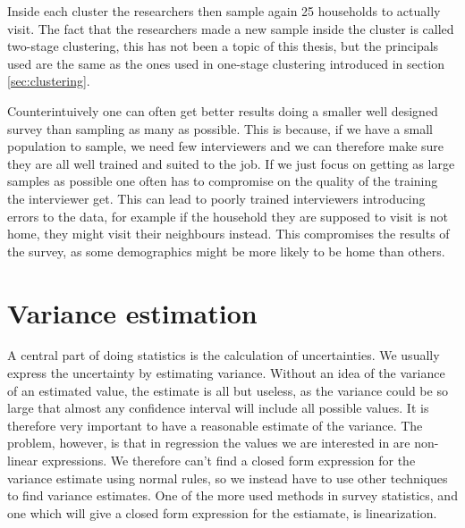 \documentclass{article}
\begin{document}
Inside each cluster the researchers then sample again 25 households to actually
visit. The fact that the researchers made a new sample inside the cluster is
called two-stage clustering, this has not been a topic of this thesis, but the
principals used are the same as the ones used in one-stage clustering introduced
in section \ref{sec:clustering}.

Counterintuively one can often get better results doing a smaller well designed
survey than sampling as many as possible. This is because, if we have a small
population to sample, we need few interviewers and we can therefore make sure
they are all well trained and suited to the job. If we just focus on getting as
large samples as possible one often has to compromise on the quality of the
training the interviewer get. This can lead to poorly trained interviewers introducing errors
to the data, for example if the household they are supposed to visit is not
home, they might visit their neighbours instead. This compromises the results of
the survey, as some demographics might be more likely to be home than others.

\section{Variance estimation} \label{sec:VarEst}

A central part of doing statistics is the calculation of uncertainties. We
usually express the uncertainty by estimating variance. Without an idea of the
variance of an estimated value, the estimate is all but useless, as the variance
could be so large that almost any confidence interval will include all possible
values. It is therefore very important to have a reasonable estimate of the
variance. The problem, however, is that in regression the values we are
interested in are non-linear expressions. We therefore can't find a closed form
expression for the variance estimate using normal rules, so we instead have to
use other techniques to
find variance estimates. One of the more used methods in survey
statistics, and one which will give a closed form expression for the estiamate,
is linearization.
\end{document}
